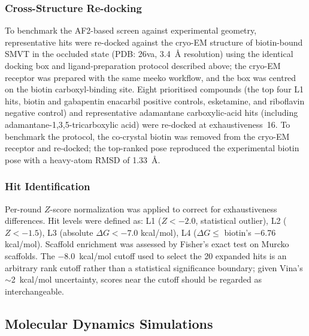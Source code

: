 \documentclass[10pt,letterpaper]{article}
\begin{document}
\subsubsection*{Cross-Structure Re-docking}
To benchmark the AF2-based screen against experimental geometry, representative hits were re-docked against the cryo-EM structure of biotin-bound SMVT in the occluded state (PDB: 26va, 3.4~\AA{} resolution) using the identical docking box and ligand-preparation protocol described above; the cryo-EM receptor was prepared with the same meeko workflow, and the box was centred on the biotin carboxyl-binding site. Eight prioritised compounds (the top four L1 hits, biotin and gabapentin enacarbil positive controls, esketamine, and riboflavin negative control) and representative adamantane carboxylic-acid hits (including adamantane-1,3,5-tricarboxylic acid) were re-docked at exhaustiveness~16. To benchmark the protocol, the co-crystal biotin was removed from the cryo-EM receptor and re-docked; the top-ranked pose reproduced the experimental biotin pose with a heavy-atom RMSD of 1.33~\AA{}.

\subsubsection*{Hit Identification}
Per-round $Z$-score normalization was applied to correct for exhaustiveness differences. Hit levels were defined as: L1 ($Z < -2.0$, statistical outlier), L2 ($Z < -1.5$), L3 (absolute $\Delta G < -7.0$ kcal/mol), L4 ($\Delta G \leq$ biotin's $-$6.76 kcal/mol). Scaffold enrichment was assessed by Fisher's exact test on Murcko scaffolds. The $-$8.0~kcal/mol cutoff used to select the 20 expanded hits is an arbitrary rank cutoff rather than a statistical significance boundary; given Vina's $\sim$2~kcal/mol uncertainty, scores near the cutoff should be regarded as interchangeable.

\subsection*{Molecular Dynamics Simulations}
\end{document}
